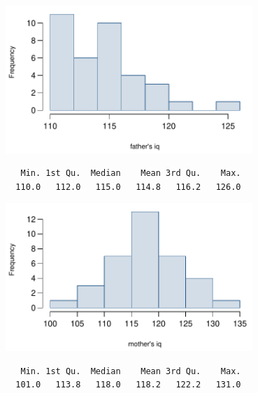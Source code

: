 \documentclass[11pt]{article}
\begin{document}
\begin{enumerate}
\begin{minipage}[c]{0.5\textwidth}
\begin{center}
\includegraphics[width=0.7\textwidth]{figures/gifted/father_iq_hist}
{\footnotesize
\begin{verbatim}
   Min. 1st Qu.  Median    Mean 3rd Qu.    Max. 
  110.0   112.0   115.0   114.8   116.2   126.0 
\end{verbatim}
}
\end{center}
\end{minipage}
\begin{minipage}[c]{0.5\textwidth}
\begin{center}
\includegraphics[width=0.7\textwidth]{figures/gifted/mother_iq_hist}
\end{center}
{\footnotesize
\begin{verbatim}
   Min. 1st Qu.  Median    Mean 3rd Qu.    Max. 
  101.0   113.8   118.0   118.2   122.2   131.0 
\end{verbatim}
}
\end{minipage}

\begin{enumerate}


\end{enumerate}
\end{enumerate}
\end{document}
